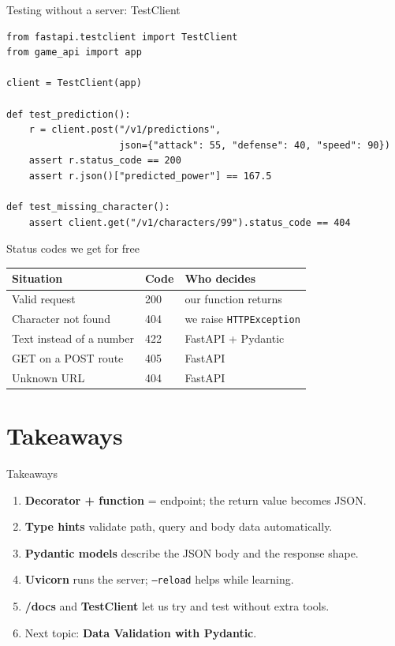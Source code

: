 \documentclass[aspectratio=169,10pt]{beamer}
\begin{document}
\begin{frame}[fragile]{Testing without a server: TestClient}
\begin{lstlisting}
from fastapi.testclient import TestClient
from game_api import app

client = TestClient(app)

def test_prediction():
    r = client.post("/v1/predictions",
                    json={"attack": 55, "defense": 40, "speed": 90})
    assert r.status_code == 200
    assert r.json()["predicted_power"] == 167.5

def test_missing_character():
    assert client.get("/v1/characters/99").status_code == 404
\end{lstlisting}
\end{frame}

\begin{frame}{Status codes we get for free}
\begin{center}
\begin{tabular}{lll}
\toprule
\textbf{Situation} & \textbf{Code} & \textbf{Who decides} \\
\midrule
\rowcolor{mlgreen!12} Valid request & 200 & our function returns \\
\rowcolor{mlorange!15} Character not found & 404 & we raise \texttt{HTTPException} \\
\rowcolor{mlred!12} Text instead of a number & 422 & FastAPI + Pydantic \\
\rowcolor{mlred!12} GET on a POST route & 405 & FastAPI \\
\rowcolor{mlorange!15} Unknown URL & 404 & FastAPI \\
\bottomrule
\end{tabular}
\end{center}
\end{frame}

\section{Takeaways}

\begin{frame}{Takeaways}
\begin{enumerate}
\item \textbf{Decorator + function} = endpoint; the return value becomes JSON.
\item \textbf{Type hints} validate path, query and body data automatically.
\item \textbf{Pydantic models} describe the JSON body and the response shape.
\item \textbf{Uvicorn} runs the server; \texttt{--reload} helps while learning.
\item \textbf{/docs} and \textbf{TestClient} let us try and test without extra tools.
\item Next topic: \textbf{Data Validation with Pydantic}.
\end{enumerate}
\end{frame}
\end{document}
